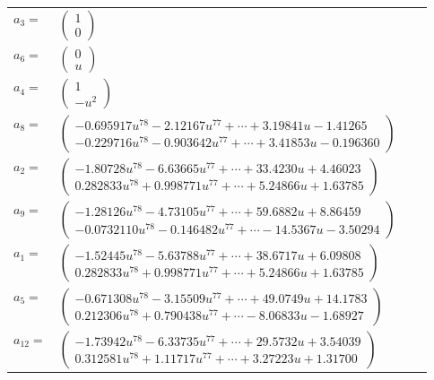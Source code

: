 \documentclass[1p]{elsarticle_modified}
\theoremstyle{definition}
\begin{document}
\begin{tabular}{m{7pt} m{180pt} m{7pt} m{180pt} }
\flushright $a_{3}=$&$\begin{pmatrix}1\\0\end{pmatrix}$ \\
\flushright $a_{6}=$&$\begin{pmatrix}0\\u\end{pmatrix}$ \\
\flushright $a_{4}=$&$\begin{pmatrix}1\\- u^2\end{pmatrix}$ \\
\flushright $a_{8}=$&$\begin{pmatrix}-0.695917 u^{78}-2.12167 u^{77}+\cdots+3.19841 u-1.41265\\-0.229716 u^{78}-0.903642 u^{77}+\cdots+3.41853 u-0.196360\end{pmatrix}$ \\
\flushright $a_{2}=$&$\begin{pmatrix}-1.80728 u^{78}-6.63665 u^{77}+\cdots+33.4230 u+4.46023\\0.282833 u^{78}+0.998771 u^{77}+\cdots+5.24866 u+1.63785\end{pmatrix}$ \\
\flushright $a_{9}=$&$\begin{pmatrix}-1.28126 u^{78}-4.73105 u^{77}+\cdots+59.6882 u+8.86459\\-0.0732110 u^{78}-0.146482 u^{77}+\cdots-14.5367 u-3.50294\end{pmatrix}$ \\
\flushright $a_{1}=$&$\begin{pmatrix}-1.52445 u^{78}-5.63788 u^{77}+\cdots+38.6717 u+6.09808\\0.282833 u^{78}+0.998771 u^{77}+\cdots+5.24866 u+1.63785\end{pmatrix}$ \\
\flushright $a_{5}=$&$\begin{pmatrix}-0.671308 u^{78}-3.15509 u^{77}+\cdots+49.0749 u+14.1783\\0.212306 u^{78}+0.790438 u^{77}+\cdots-8.06833 u-1.68927\end{pmatrix}$ \\
\flushright $a_{12}=$&$\begin{pmatrix}-1.73942 u^{78}-6.33735 u^{77}+\cdots+29.5732 u+3.54039\\0.312581 u^{78}+1.11717 u^{77}+\cdots+3.27223 u+1.31700\end{pmatrix}$ \\

\end{tabular}
\end{document}
